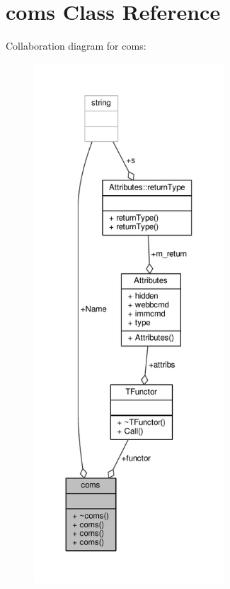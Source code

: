 \hypertarget{classcoms}{}\section{coms Class Reference}
\label{classcoms}


Collaboration diagram for coms\+:
\nopagebreak
\begin{figure}[H]
\begin{center}
\leavevmode
\includegraphics[height=550pt]{df/d9d/classcoms__coll__graph}
\end{center}
\end{figure}
